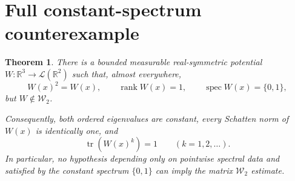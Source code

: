 \documentclass[11pt]{article}
\newtheorem{theorem}{Theorem}
\newcommand{\R}{\mathbb R}
\newcommand{\Wtwo}{\mathcal W_2}
\begin{document}
\section{Full constant-spectrum counterexample}

\begin{theorem}\label{thm:negative}
There is a bounded measurable real-symmetric potential
$W:\R^3\to\mathcal L(\R^2)$ such that, almost everywhere,
\[
 W(x)^2=W(x),\qquad \operatorname{rank}W(x)=1,\qquad
 \operatorname{spec}W(x)=\{0,1\},
\]
but $W\notin\Wtwo$.

Consequently, both ordered eigenvalues are constant, every Schatten norm of
$W(x)$ is identically one, and
\[
 \operatorname{tr}(W(x)^k)=1\qquad(k=1,2,\ldots).
\]
In particular, no hypothesis depending only on pointwise spectral data and
satisfied by the constant spectrum $\{0,1\}$ can imply the matrix
$\Wtwo$ estimate.
\end{theorem}
\end{document}
